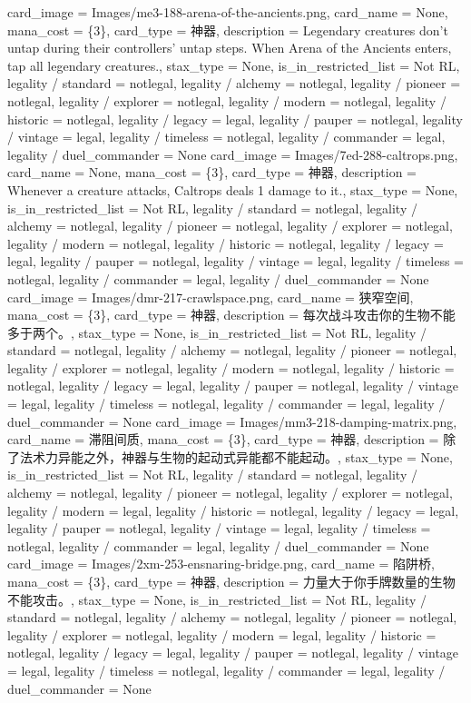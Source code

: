 \documentclass[lang = cn, color = black, 10pt]{AllThatStax}
\begin{document}
\card
{
	card_image = Images/me3-188-arena-of-the-ancients.png,
	card_name = None,
	mana_cost = \{3\},
	card_type = 神器,
	description = Legendary creatures don't untap during their controllers' untap steps.
	When Arena of the Ancients enters, tap all legendary creatures.,
	stax_type = None,
	is_in_restricted_list = Not RL,
	legality / standard = notlegal,
	legality / alchemy = notlegal,
	legality / pioneer = notlegal,
	legality / explorer = notlegal,
	legality / modern = notlegal,
	legality / historic = notlegal,
	legality / legacy = legal,
	legality / pauper = notlegal,
	legality / vintage = legal,
	legality / timeless = notlegal,
	legality / commander = legal,
	legality / duel_commander = None
}
\card
{
	card_image = Images/7ed-288-caltrops.png,
	card_name = None,
	mana_cost = \{3\},
	card_type = 神器,
	description = Whenever a creature attacks, Caltrops deals 1 damage to it.,
	stax_type = None,
	is_in_restricted_list = Not RL,
	legality / standard = notlegal,
	legality / alchemy = notlegal,
	legality / pioneer = notlegal,
	legality / explorer = notlegal,
	legality / modern = notlegal,
	legality / historic = notlegal,
	legality / legacy = legal,
	legality / pauper = notlegal,
	legality / vintage = legal,
	legality / timeless = notlegal,
	legality / commander = legal,
	legality / duel_commander = None
}
\card
{
	card_image = Images/dmr-217-crawlspace.png,
	card_name = 狭窄空间,
	mana_cost = \{3\},
	card_type = 神器,
	description = 每次战斗攻击你的生物不能多于两个。,
	stax_type = None,
	is_in_restricted_list = Not RL,
	legality / standard = notlegal,
	legality / alchemy = notlegal,
	legality / pioneer = notlegal,
	legality / explorer = notlegal,
	legality / modern = notlegal,
	legality / historic = notlegal,
	legality / legacy = legal,
	legality / pauper = notlegal,
	legality / vintage = legal,
	legality / timeless = notlegal,
	legality / commander = legal,
	legality / duel_commander = None
}
\card
{
	card_image = Images/mm3-218-damping-matrix.png,
	card_name = 滞阻间质,
	mana_cost = \{3\},
	card_type = 神器,
	description = 除了法术力异能之外，神器与生物的起动式异能都不能起动。,
	stax_type = None,
	is_in_restricted_list = Not RL,
	legality / standard = notlegal,
	legality / alchemy = notlegal,
	legality / pioneer = notlegal,
	legality / explorer = notlegal,
	legality / modern = legal,
	legality / historic = notlegal,
	legality / legacy = legal,
	legality / pauper = notlegal,
	legality / vintage = legal,
	legality / timeless = notlegal,
	legality / commander = legal,
	legality / duel_commander = None
}
\card
{
	card_image = Images/2xm-253-ensnaring-bridge.png,
	card_name = 陷阱桥,
	mana_cost = \{3\},
	card_type = 神器,
	description = 力量大于你手牌数量的生物不能攻击。,
	stax_type = None,
	is_in_restricted_list = Not RL,
	legality / standard = notlegal,
	legality / alchemy = notlegal,
	legality / pioneer = notlegal,
	legality / explorer = notlegal,
	legality / modern = legal,
	legality / historic = notlegal,
	legality / legacy = legal,
	legality / pauper = notlegal,
	legality / vintage = legal,
	legality / timeless = notlegal,
	legality / commander = legal,
	legality / duel_commander = None
}
\end{document}
